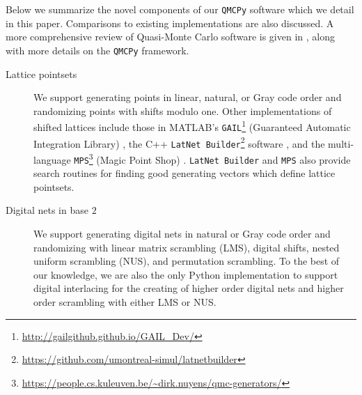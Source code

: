 \documentclass[acmsmall]{acmart}
\begin{document}
Below we summarize the novel components of our \texttt{QMCPy} software which we detail in this paper. Comparisons to existing implementations are also discussed. A more comprehensive review of Quasi-Monte Carlo software is given in \citep{choi.QMC_software}, along with more details on the \texttt{QMCPy} framework. 
\begin{description}
    \item[Lattice pointsets] We support generating points in linear, natural, or Gray code order and randomizing points with shifts modulo one. Other implementations of shifted lattices include those in MATLAB's \texttt{GAIL}\footnote{\url{http://gailgithub.github.io/GAIL_Dev/}} (Guaranteed Automatic Integration Library) \citep{GAIL.software,hickernell2018monte}, the C++ \texttt{LatNet Builder}\footnote{\url{https://github.com/umontreal-simul/latnetbuilder}} software \citep{LatNetBuilder.software}, and the multi-language \texttt{MPS}\footnote{\url{https://people.cs.kuleuven.be/~dirk.nuyens/qmc-generators/}} (Magic Point Shop) \citep{MagicPointShop.software}. \texttt{LatNet Builder} and \texttt{MPS} also provide search routines for finding good generating vectors which define lattice pointsets.
    \item[Digital nets in base $2$] We support generating digital nets in natural or Gray code order and randomizing with linear matrix scrambling (LMS), digital shifts, nested uniform scrambling (NUS), and permutation scrambling. To the best of our knowledge, we are also the only Python implementation to support digital interlacing for the creating of higher order digital nets and higher order scrambling with either LMS or NUS. 
    

\end{description}
\end{document}
